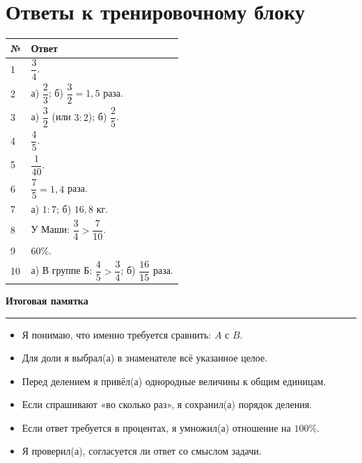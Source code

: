 \documentclass[a4paper,12pt]{article}
\begin{document}
\clearpage
\section*{Ответы к тренировочному блоку}
\vspace{2mm}
\renewcommand{\arraystretch}{1.44}
\begin{tabularx}{\linewidth}{@{}p{.12\linewidth}X@{}}
\toprule
\textbf{№} & \textbf{Ответ}\\
\midrule
1 & $\dfrac34$.\\
2 & а) $\dfrac23$; б) $\dfrac32=1{,}5$ раза.\\
3 & а) $\dfrac32$ (или $3:2$); б) $\dfrac25$.\\
4 & $\dfrac45$.\\
5 & $\dfrac1{40}$.\\
6 & $\dfrac75=1{,}4$ раза.\\
7 & а) $1:7$; б) $16{,}8$ кг.\\
8 & У Маши: $\dfrac34>\dfrac7{10}$.\\
9 & $60\%$.\\
10 & а) В группе Б: $\dfrac45>\dfrac34$; б) $\dfrac{16}{15}$ раза.\\
\bottomrule
\end{tabularx}

\vspace{13mm}
{\large\bfseries\color{darkaccent}Итоговая памятка}\par
\vspace{2mm}\color{accent}\rule{\linewidth}{0.45pt}\color{black}

\begin{itemize}[label=$\square$,itemsep=7pt]
\item Я понимаю, что именно требуется сравнить: $A$ с $B$.
\item Для доли я выбрал(а) в знаменателе всё указанное целое.
\item Перед делением я привёл(а) однородные величины к общим единицам.
\item Если спрашивают «во сколько раз», я сохранил(а) порядок деления.
\item Если ответ требуется в процентах, я умножил(а) отношение на $100\%$.
\item Я проверил(а), согласуется ли ответ со смыслом задачи.
\end{itemize}
\end{document}
